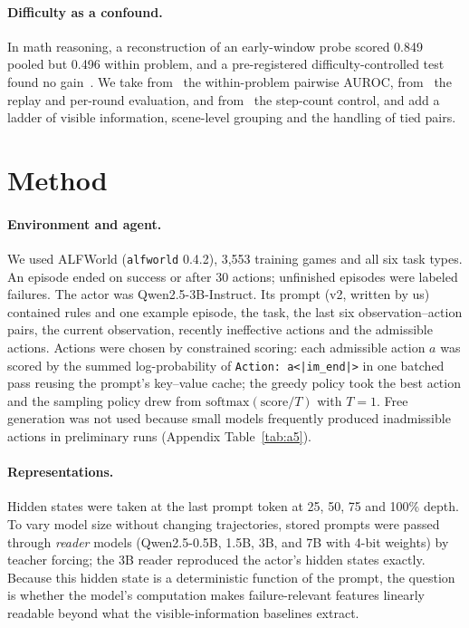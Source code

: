 \documentclass[10pt]{article}
\newcommand{\code}[1]{\texttt{#1}}
\begin{document}
\paragraph{Difficulty as a confound.} In math reasoning, a reconstruction of an early-window probe scored 0.849 pooled but 0.496 within problem, and a pre-registered difficulty-controlled test found no gain~\cite{bulut2026problem}. We take from~\cite{bulut2026problem} the within-problem pairwise AUROC, from~\cite{ruan2026doomed} the replay and per-round evaluation, and from~\cite{wang2026failfast} the step-count control, and add a ladder of visible information, scene-level grouping and the handling of tied pairs.

\section{Method}
\paragraph{Environment and agent.} We used ALFWorld (\code{alfworld} 0.4.2), 3,553 training games and all six task types. An episode ended on success or after 30 actions; unfinished episodes were labeled failures.
The actor was Qwen2.5-3B-Instruct. Its prompt (v2, written by us) contained rules and one example episode, the task, the last six observation--action pairs, the current observation, recently ineffective actions and the admissible actions.
Actions were chosen by constrained scoring: each admissible action $a$ was scored by the summed log-probability of \code{Action: a<|im\_end|>} in one batched pass reusing the prompt's key--value cache; the greedy policy took the best action and the sampling policy drew from $\mathrm{softmax}(\text{score}/T)$ with $T=1$.
Free generation was not used because small models frequently produced inadmissible actions in preliminary runs (Appendix Table~\ref{tab:a5}).

\paragraph{Representations.} Hidden states were taken at the last prompt token at 25, 50, 75 and 100\% depth. To vary model size without changing trajectories, stored prompts were passed through \emph{reader} models (Qwen2.5-0.5B, 1.5B, 3B, and 7B with 4-bit weights) by teacher forcing; the 3B reader reproduced the actor's hidden states exactly. Because this hidden state is a deterministic function of the prompt, the question is whether the model's computation makes failure-relevant features linearly readable beyond what the visible-information baselines extract.
\end{document}
